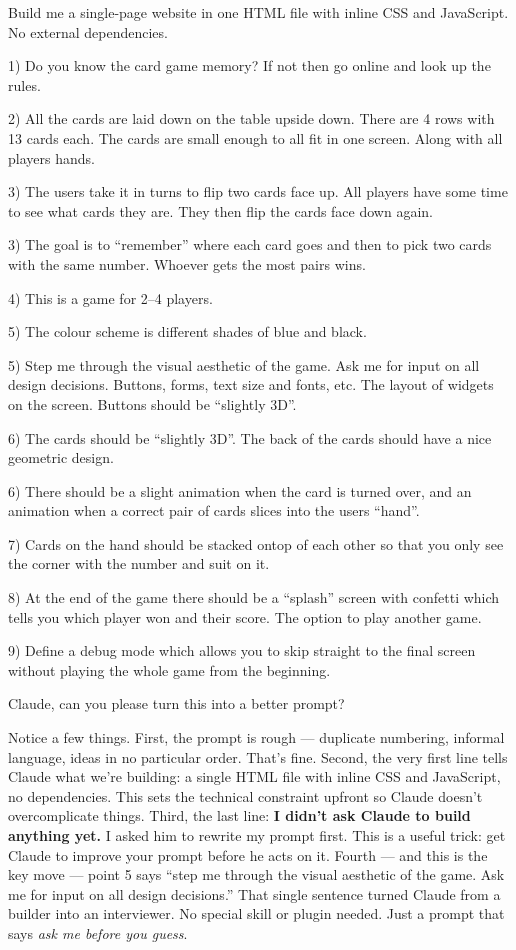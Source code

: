 \documentclass[11pt,a4paper]{article}
\begin{document}
\begin{tcolorbox}[promptbox]
Build me a single-page website in one HTML file with inline CSS and JavaScript. No external dependencies.

1) Do you know the card game memory? If not then go online and look up the rules.

2) All the cards are laid down on the table upside down. There are 4 rows with 13 cards each. The cards are small enough to all fit in one screen. Along with all players hands.

3) The users take it in turns to flip two cards face up. All players have some time to see what cards they are. They then flip the cards face down again.

3) The goal is to ``remember'' where each card goes and then to pick two cards with the same number. Whoever gets the most pairs wins.

4) This is a game for 2--4 players.

5) The colour scheme is different shades of blue and black.

5) Step me through the visual aesthetic of the game. Ask me for input on all design decisions. Buttons, forms, text size and fonts, etc. The layout of widgets on the screen. Buttons should be ``slightly 3D''.

6) The cards should be ``slightly 3D''. The back of the cards should have a nice geometric design.

6) There should be a slight animation when the card is turned over, and an animation when a correct pair of cards slices into the users ``hand''.

7) Cards on the hand should be stacked ontop of each other so that you only see the corner with the number and suit on it.

8) At the end of the game there should be a ``splash'' screen with confetti which tells you which player won and their score. The option to play another game.

9) Define a debug mode which allows you to skip straight to the final screen without playing the whole game from the beginning.

Claude, can you please turn this into a better prompt?
\end{tcolorbox}

Notice a few things. First, the prompt is rough --- duplicate numbering, informal language, ideas in no particular order. That's fine. Second, the very first line tells Claude what we're building: a single HTML file with inline CSS and JavaScript, no dependencies. This sets the technical constraint upfront so Claude doesn't overcomplicate things. Third, the last line: \textbf{I didn't ask Claude to build anything yet.} I asked him to rewrite my prompt first. This is a useful trick: get Claude to improve your prompt before he acts on it. Fourth --- and this is the key move --- point 5 says ``step me through the visual aesthetic of the game. Ask me for input on all design decisions.'' That single sentence turned Claude from a builder into an interviewer. No special skill or plugin needed. Just a prompt that says \emph{ask me before you guess}.
\end{document}
